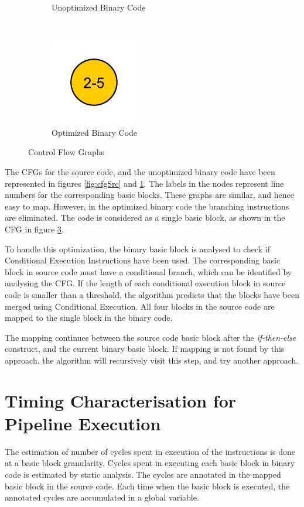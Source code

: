 \begin{figure}[h!]
\begin{subfigure}[t]{.33\textwidth}
\caption{Unoptimized Binary Code}
\label{fig:cfgUnopt}
\end{subfigure}%
~
\begin{subfigure}[t]{.33\textwidth}
\centering
\captionsetup{margin=10pt}
\includegraphics[width=.5\textwidth]{figures/CondExecObjOptFlowChart.pdf}
\caption{Optimized Binary Code}
\label{fig:cfgOpt}
\end{subfigure}
\caption{Control Flow Graphs}
\end{figure}

The CFGs for the source code, and the unoptimized binary code have been represented in figures \ref{fig:cfgSrc} and \ref{fig:cfgUnopt}. The labels in the nodes represent line numbers for the corresponding basic blocks. These graphs are similar, and hence easy to map. However, in the optimized binary code the branching instructions are eliminated. The code is considered as a single basic block, as shown in the CFG in figure \ref{fig:cfgOpt}.

To handle this optimization, the binary basic block is analysed to check if Conditional Execution Instructions have been used. The corresponding basic block in source code must have a conditional branch, which can be identified by analysing the CFG. If the length of each conditional execution block in source code is smaller than a threshold, the algorithm predicts that the blocks have been merged using Conditional Execution. All four blocks in the source code are mapped to the single block in the binary code.

The mapping continues between the source code basic block after the \emph{if-then-else} construct, and the current binary basic block. If mapping is not found by this approach, the algorithm will recursively visit this step, and try another approach. 

\section{Timing Characterisation for Pipeline Execution}
The estimation of number of cycles spent in execution of the instructions is done at a basic block granularity. Cycles spent in executing each basic block in binary code is estimated by static analysis. The cycles are annotated in the mapped basic block in the source code. Each time when the basic block is executed, the annotated cycles are accumulated in a global variable.

